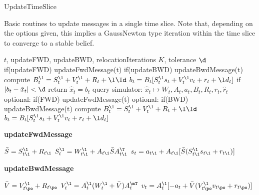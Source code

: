 \begin{algorithm}[t]
\caption{UpdateTimeSlice
\label{algTimeSlice}}
\small
Basic routines to update messages in a single time slice. Note that,
depending on the options given, this implies a GaussNewton type
iteration within the time slice to converge to a stable belief.

\medskip

{
\begin{algorithmic}[1]\small
\REQUIRE $t$, updateFWD, updateBWD, relocationIterations $K$, tolerance $\d$
\STATE if(updateFWD) updateFwdMessage(t)
\STATE if(updateBWD) updateBwdMessage(t)
\STATE compute $B_t^\1 = S^\1_t + V^\1_t + R_t + \l\Id$
\STATE $b_t = B_t[S^\1_t s_t + V^\1_t v_t + r_t + \l d_t]$
    \STATE if $|b_t-\hat x_t|<\d$ return
    \STATE $\hat x_t = b_t$
    \STATE query simulator: $\hat x_t \mapsto W_t, A_t, a_t,
     B_t, R_t, r_t, \hat r_t$
    \STATE optional: if(FWD) updateFwdMessage(t)
    \STATE optional: if(BWD) updateBwdMessage(t)
    \STATE compute $B_t^\1 = S^\1_t + V^\1_t + R_t + \l\Id$
    \STATE $b_t = B_t[S^\1_t s_t + V^\1_t v_t + r_t + \l d_t]$
\ENDFOR
\end{algorithmic}
}{
\bigskip\textbf{\textsf{updateFwdMessage}}
\begin{algorithmic}[1]\small
\STATE $\bar S = S^\1_{t\1} + R_{t\1}$
\STATE $S_t^\1 = W^\1_{t\1} + A_{t\1} \bar S A_{t\1}^\T$
\STATE $s_t = a_{t\1} + A_{t\1} [\bar S (S^\1_{t\1} s_{t\1} + r_{t\1})]$
\end{algorithmic}

\bigskip\textbf{\textsf{updateBwdMessage}}
\begin{algorithmic}[1]\small
\STATE $\bar V = V^\1_{t\po} + R_{t\po}$
\STATE $V_t^\1 =  A^\1_t (W^\1_t + \bar V) A_t^\mT$
\STATE $v_t = A^\1_t [-a_t + \bar V (V^\1_{t\po} v_{t\po} + r_{t\po})]$
\end{algorithmic}

}
\end{algorithm}

